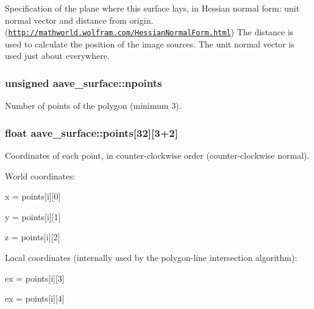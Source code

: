 Specification of the plane where this surface lays, in Hessian normal form\-: unit normal vector and distance from origin. (\href{http://mathworld.wolfram.com/HessianNormalForm.html}{\tt http\-://mathworld.\-wolfram.\-com/\-Hessian\-Normal\-Form.\-html}) The distance is used to calculate the position of the image sources. The unit normal vector is used just about everywhere. \hypertarget{structaave__surface_a30f288c41c0a36c0a2492ab100e6c05c}{
\subsubsection[{npoints}]{\setlength{\rightskip}{0pt plus 5cm}unsigned aave\-\_\-surface\-::npoints}}\label{structaave__surface_a30f288c41c0a36c0a2492ab100e6c05c}
Number of points of the polygon (minimum 3). \hypertarget{structaave__surface_a6bd0e3127c052c7cf3ffa49480acda83}{
\subsubsection[{points}]{\setlength{\rightskip}{0pt plus 5cm}float aave\-\_\-surface\-::points\mbox{[}32\mbox{]}\mbox{[}3+2\mbox{]}}}\label{structaave__surface_a6bd0e3127c052c7cf3ffa49480acda83}
Coordinates of each point, in counter-\/clockwise order (counter-\/clockwise normal).

World coordinates\-:
\begin{DoxyItemize}
\item x = points\mbox{[}i\mbox{]}\mbox{[}0\mbox{]}
\item y = points\mbox{[}i\mbox{]}\mbox{[}1\mbox{]}
\item z = points\mbox{[}i\mbox{]}\mbox{[}2\mbox{]}
\end{DoxyItemize}

Local coordinates (internally used by the polygon-\/line intersection algorithm)\-:
\begin{DoxyItemize}
\item ex = points\mbox{[}i\mbox{]}\mbox{[}3\mbox{]}
\item ex = points\mbox{[}i\mbox{]}\mbox{[}4\mbox{]}
\end{DoxyItemize}

